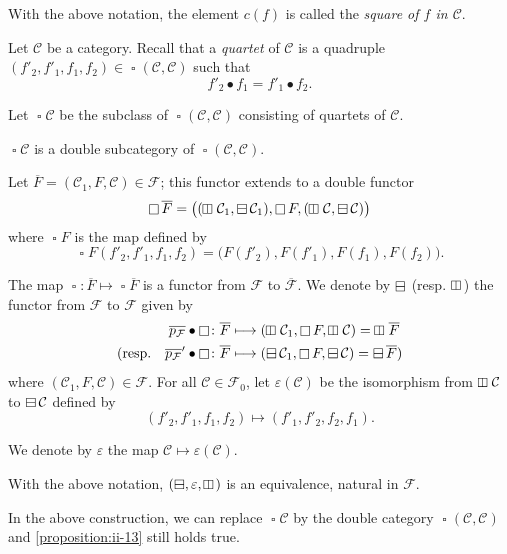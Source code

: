 \documentclass[a4paper,fleqn]{article}
\theoremstyle{plain}
\newenvironment{proposition}[1]
  {\renewcommand\theinnerproposition{#1}\innerproposition}
  {\endinnerproposition}
\theoremstyle{definition}
\newenvironment{definition}[1]
  {\renewcommand\theinnerdefinition{#1}\innerdefinition}
  {\endinnerdefinition}
\newcommand{\oldpage}[1]{{\marginpar{\footnotesize$\bigg\vert$\,\,\,\,\textit{p.~#1}}}}
\newcommand{\CC}{\mathcal{C}}
\newcommand{\FF}{\mathcal{F}}
\newcommand{\hsqbox}{{\boxminus}}
\newcommand{\vsqbox}{{\rotatebox{90}{$\boxminus$}}}
\DeclareMathOperator{\sq}{\square}
\DeclareMathOperator{\hsq}{\raisebox{-.05em}{$\hsqbox$}}
\DeclareMathOperator{\vsq}{\raisebox{-.1em}{$\vsqbox$\,}}
\begin{document}
\begin{definition}{14}
\label{definition:ii-14}
  With the above notation, the element $c(f)$ is called the \emph{square of $f$ in $\CC$}.
\end{definition}

Let $\CC$ be a category.
Recall \cite{3a} that a \emph{quartet} of $\CC$ is a quadruple $(f'_2,f'_1,f_1,f_2)\in\sq(\CC,\CC)$ such that
\[
  f'_2\bullet f_1
  = f'_1\bullet f_2.
\]

Let $\sq\CC$ be the subclass of $\sq(\CC,\CC)$ consisting of quartets of $\CC$.

\begin{proposition}{12}
\label{proposition:ii-12}
  $\sq\CC$ is a double subcategory of $\sq(\CC,\CC)$.
\end{proposition}

Let $\overline{F}=(\CC_1,F,\CC)\in\FF$;
this functor extends to a double functor
\[
  \sq\overline{F}
  = \big(
    (\vsq\CC_1,\hsq\CC_1), \sq F, (\vsq\CC,\hsq\CC)
  \big)
\]
where $\sq F$ is the map defined by
\[
  \sq F(f'_2,f'_1,f_1,f_2)
  = \big(
    F(f'_2), F(f'_1), F(f_1), F(f_2)
  \big).
\]

\oldpage{395}
The map $\sq\colon\overline{F}\mapsto\sq\overline{F}$ is a functor from $\FF$ to $\overline{\FF}$.
We denote by $\hsq$ (resp. $\vsq$) the functor from $\FF$ to $\FF$ given by
\[
  \begin{aligned}
    \overline{p_\FF}\bullet\sq
    &\colon \overline{F}
    \longmapsto (\vsq\CC_1,\sq F,\vsq\CC)
    = \vsq\overline{F}
  \\(\text{resp.}\quad \overline{p_\FF}'\bullet\sq
    &\colon \overline{F}
    \longmapsto (\hsq\CC_1,\sq F,\hsq\CC)
    = \hsq\overline{F})
  \end{aligned}
\]
where $(\CC_1,F,\CC)\in\FF$.
For all $\CC\in\FF_0$, let $\varepsilon(\CC)$ be the isomorphism from $\vsq\CC$ to $\hsq\CC$ defined by
\[
  (f'_2,f'_1,f_1,f_2)
  \longmapsto (f'_1,f'_2,f_2,f_1).
\]

We denote by $\varepsilon$ the map $\CC\mapsto\varepsilon(\CC)$.

\begin{proposition}{13}
\label{proposition:ii-13}
  With the above notation, $(\hsq,\varepsilon,\vsq)$ is an equivalence, natural in $\FF$.
\end{proposition}

In the above construction, we can replace $\sq\CC$ by the double category $\sq(\CC,\CC)$ and \cref{proposition:ii-13} still holds true.
\end{document}
